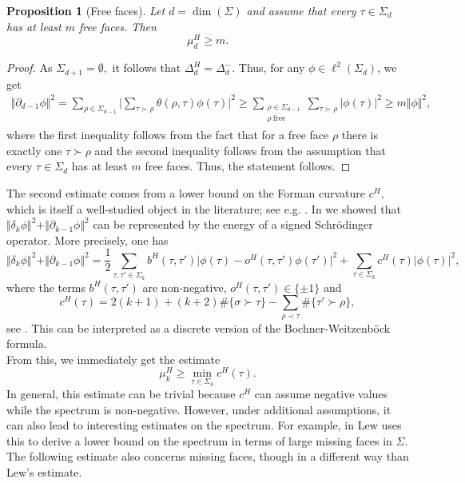 \documentclass[10pt]{amsart}
\newtheorem{proposition}[theorem]{Proposition}
\theoremstyle{definition}
\begin{document}
\begin{proposition}[Free faces]
    Let $d = \dim(\Sigma)$ and assume that every $\tau\in\Sigma_d$ has at least $m$ free faces. Then \[\mu^H_d\geq m.\]
\end{proposition}
\begin{proof}
    As $\Sigma_{d+1} = \emptyset,$ it follows that $\Delta^H_d = \Delta^-_d.$ Thus, for any $\phi\in\ell^2(\Sigma_d)$, we get
\begin{align*}    \Vert\partial_{d-1}\phi\Vert^2 = \sum_{\rho\in\Sigma_{d-1}}\Big\vert\sum_{\tau\succ\rho}\theta(\rho,\tau)\phi(\tau)\Big\vert^2\geq\sum_{\substack{\rho\in\Sigma_{d-1}\\ \rho~ \text{free}}}\sum_{\tau\succ\rho}\vert\phi(\tau)\vert^2\geq m\Vert\phi\Vert^2,
\end{align*}
where the first inequality follows from the fact that for a free face $\rho$ there is exactly one $\tau\succ\rho$ and the second inequality follows from the assumption that every $\tau\in\Sigma_d$ has at least $m$ free faces.
Thus, the statement follows.
\end{proof}
The second estimate comes from a lower bound on the Forman curvature $c^H,$ which is itself a well-studied object in the literature; see e.g. \cite{BK,F,JM,Leal,Saucan, Sreejith}. In \cite{BK} we showed that $\Vert\delta_k\phi\Vert^2+\Vert\partial_{k-1}\phi\Vert^2$ can be represented by the energy of a signed Schrödinger operator. More precisely, one has
\[\Vert\delta_k\phi\Vert^2+\Vert\partial_{k-1}\phi\Vert^2 = \frac{1}{2}\sum_{\tau,\tau'\in\Sigma_k}b^H(\tau,\tau')\vert\phi(\tau)-o^H(\tau,\tau')\phi(\tau')\vert^2+\sum_{\tau\in\Sigma_k}c^H(\tau)\vert\phi(\tau)\vert^2,\]
where the terms $b^H(\tau,\tau')$ are non-negative, $o^H(\tau,\tau')\in\lbrace\pm 1\rbrace$ and \[c^H(\tau) = 2(k+1)+(k+2)\#\lbrace\sigma\succ\tau\rbrace-\sum_{\rho\prec\tau}\#\lbrace \tau'\succ \rho\rbrace,\]
see \cite{BK,lewfaces}. This can be interpreted as a discrete version of the Bochner-Weitzenböck formula.\\
From this, we immediately get the estimate
\[\mu^H_k\geq\min_{\tau\in\Sigma_k}c^H(\tau).\] In general, this estimate can be trivial because $c^H$ can assume negative values while the spectrum is non-negative. However, under additional assumptions, it can also lead to interesting estimates on the spectrum. For example, in \cite{lewfaces} Lew uses this to derive a lower bound on the spectrum in terms of large missing faces in $\Sigma.$ The following estimate also concerns missing faces, though in a different way than Lew's estimate.\\
\end{document}
